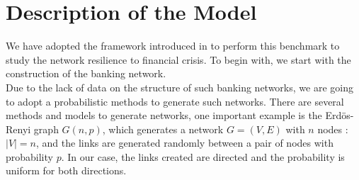 \documentclass[14pt]{article}
\begin{document}
 \section{Description of the Model}
We have adopted the framework introduced in \cite{art1} to perform this benchmark to study the network resilience to financial crisis. To begin with, we start with the construction of the banking network. 
\\Due to the lack of data on the structure of such banking networks, we are going to adopt a probabilistic methods to generate such networks. There are several methods and models to generate networks, one important example is the Erd{\"o}s-Renyi graph $G(n,p)$, which generates a network $G=(V,E)$ with $n$ nodes : $|V|=n$, and the links are generated randomly between a pair of nodes with  probability $p$. In our case, the links created are directed and the probability is uniform for both directions.
\end{document}
